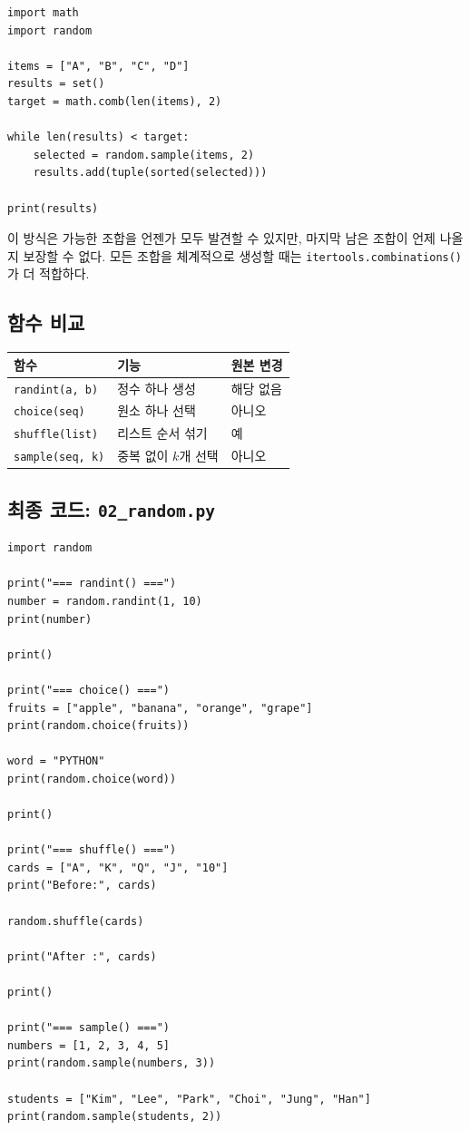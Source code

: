 \documentclass[11pt,a4paper]{article}
\begin{document}
\begin{lstlisting}
import math
import random

items = ["A", "B", "C", "D"]
results = set()
target = math.comb(len(items), 2)

while len(results) < target:
    selected = random.sample(items, 2)
    results.add(tuple(sorted(selected)))

print(results)
\end{lstlisting}

이 방식은 가능한 조합을 언젠가 모두 발견할 수 있지만, 마지막 남은 조합이 언제 나올지 보장할 수 없다. 모든 조합을 체계적으로 생성할 때는 \texttt{itertools.combinations()}가 더 적합하다.

\subsection{함수 비교}

\begin{center}
\begin{tabular}{lll}
\toprule
함수 & 기능 & 원본 변경 \\
\midrule
\texttt{randint(a, b)} & 정수 하나 생성 & 해당 없음 \\
\texttt{choice(seq)} & 원소 하나 선택 & 아니오 \\
\texttt{shuffle(list)} & 리스트 순서 섞기 & 예 \\
\texttt{sample(seq, k)} & 중복 없이 $k$개 선택 & 아니오 \\
\bottomrule
\end{tabular}
\end{center}

\subsection{최종 코드: \texttt{02\_random.py}}

\begin{lstlisting}
import random

print("=== randint() ===")
number = random.randint(1, 10)
print(number)

print()

print("=== choice() ===")
fruits = ["apple", "banana", "orange", "grape"]
print(random.choice(fruits))

word = "PYTHON"
print(random.choice(word))

print()

print("=== shuffle() ===")
cards = ["A", "K", "Q", "J", "10"]
print("Before:", cards)

random.shuffle(cards)

print("After :", cards)

print()

print("=== sample() ===")
numbers = [1, 2, 3, 4, 5]
print(random.sample(numbers, 3))

students = ["Kim", "Lee", "Park", "Choi", "Jung", "Han"]
print(random.sample(students, 2))
\end{lstlisting}
\end{document}
